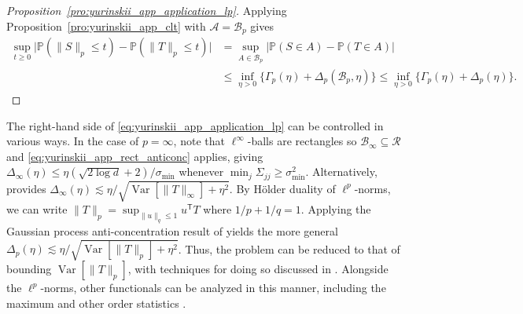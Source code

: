 \documentclass[11pt,lof]{puthesis}
\renewcommand{\P}{\ensuremath{\mathbb{P}}}
\newcommand{\cB}{\ensuremath{\mathcal{B}}}
\newcommand{\cR}{\ensuremath{\mathcal{R}}}
\newcommand{\cA}{\ensuremath{\mathcal{A}}}
\newcommand{\T}{\ensuremath{\mathsf{T}}}
\DeclareMathOperator{\Var}{Var}
\theoremstyle{break}
\theoremstyle{proof}
\newtheorem{proof}{Proof}
\begin{document}
\begin{proof}[Proposition~\ref{pro:yurinskii_app_application_lp}]

Applying Proposition~\ref{pro:yurinskii_app_clt}
with $\cA=\cB_p$ gives
%
\begin{align*}
\sup_{t \geq 0}
\big| \P( \|S\|_p \leq t )
- \P\left( \|T\|_p \leq t \right) \big|
&= \sup_{A\in \cB_p}
\big|\P(S\in A) -\P(T\in A)\big| \\
&\leq
\inf_{\eta>0}
\big\{\Gamma_p(\eta) + \Delta_p(\cB_p, \eta) \big\}
\leq
\inf_{\eta>0}
\big\{\Gamma_p(\eta) + \Delta_p(\eta) \big\}.
\end{align*}
%
\end{proof}

The right-hand side of
\eqref{eq:yurinskii_app_application_lp} can be controlled in various ways.
%
In the case of $p=\infty$,
note that $\ell^\infty$-balls are rectangles so
$\cB_\infty\subseteq \cR$
and \eqref{eq:yurinskii_app_rect_anticonc} applies, giving
$\Delta_\infty(\eta) \leq \eta (\sqrt{2\log d} + 2) / \sigma_{\min}$
whenever $\min_j \Sigma_{j j} \geq \sigma_{\min}^2$.
Alternatively, \citet[Theorem~1]{giessing2023anti} provides
$\Delta_\infty(\eta) \lesssim \eta / \sqrt{\Var[\|T\|_\infty] + \eta^2}$.
By H{\"o}lder duality of $\ell^p$-norms, we can write
$\|T\|_p = \sup_{\|u\|_q \leq 1} u^\T T$ where $1/p + 1/q = 1$.
Applying the Gaussian process anti-concentration result of
\citet[Theorem~2]{giessing2023anti} yields the more general
$\Delta_p(\eta) \lesssim \eta / \sqrt{\Var[\|T\|_p] + \eta^2}$.
Thus, the problem can be reduced to that of bounding
$\Var\left[\|T\|_p\right]$, with techniques for doing so
discussed in \citet[Section~4]{giessing2023anti}.
Alongside the $\ell^p$-norms, other functionals can be analyzed in this manner,
including the maximum and other order statistics
\citep{kozbur2021dimension,giessing2023anti}.
\end{document}
